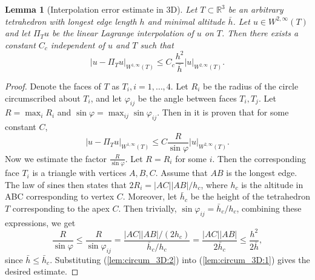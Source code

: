 \documentclass{article}
\newtheorem{lemma}{Lemma}
\theoremstyle{remark}
\def \IR {\mathbb{R}}
\def\WIi{W^{1,\infty}}
\def\WIIi{W^{2,\infty}}
\begin{document}
\begin{lemma}[Interpolation error estimate in 3D]
\label{lem:circum_3D}
Let $T\subset\IR^3$ be an arbitrary tetrahedron with longest edge length $h$ and minimal altitude $\bar{h}$. Let $u\in \WIIi(T)$ and let $\Pi_T u$ be the linear Lagrange interpolation of $u$ on $T$. Then there exists a constant $C_c$ independent of $u$ and $T$ such that
\begin{equation}
|u-\Pi_T u|_{\WIi(T)}\leq C_c \frac{h^2}{\bar{h}}|u|_{\WIIi(T)}.
\label{lem:circum_3D:est}
\end{equation}
\end{lemma}
\begin{proof}
Denote the faces of $T$ as $T_i, i=1,\ldots, 4$. Let $R_i$ be the radius of the
circle circumscribed about $T_i$, and let $\varphi_{ij}$ be the angle between faces $T_i, T_j$. Let $R=\max_i R_i$ and $\sin \varphi=\max_{ij}\sin\varphi_{ij}$. Then in \cite{Baidakova} it is proven that for some constant $C$,
\begin{equation}
\label{lem:circum_3D:1}
|u-\Pi_T u|_{\WIi(T)}\leq C \frac{R}{\sin\varphi}|u|_{\WIIi(T)}.
\end{equation}
Now we estimate the factor $\frac{R}{\sin\varphi}$. Let $R=R_i$ for some $i$. Then the corresponding face $T_i$ is a triangle with vertices $A,B,C$. Assume that $AB$ is the longest edge. The law of sines then states that $2R_i = |AC||AB|/h_c$, where $h_c$ is the altitude in ABC corresponding to vertex $C$. Moreover, let $\bar{h}_c$ be the height of the tetrahedron $T$ corresponding to the apex $C$. Then trivially, $\sin \varphi_{ij} =\bar{h}_c/h_c$, combining these expressions, we get
\begin{equation}
\label{lem:circum_3D:2}
\frac{R}{\sin\varphi}\leq \frac{R}{\sin\varphi_{ij}}= \frac{ |AC||AB|/(2h_c)}{\bar{h}_c/h_c} = \frac{ |AC||AB|}{2\bar{h}_c} \leq \frac{h^2}{2\bar{h}},
\end{equation}
since $\bar{h}\leq \bar{h}_c$. Substituting (\ref{lem:circum_3D:2}) into  (\ref{lem:circum_3D:1}) gives the desired estimate.
\end{proof}
\end{document}
